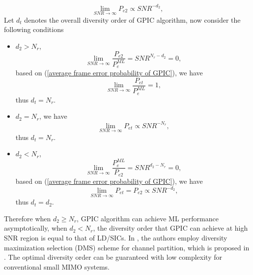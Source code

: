 \documentclass[12pt, draftclsnofoot, onecolumn]{IEEEtran}
\begin{document}
\begin{equation}
\lim_{SNR\to\infty}P_{e2}\propto SNR^{-d_{2}},
\label{LD diversity}
\end{equation}
Let $d_{t}$ denotes the overall diversity order of GPIC algorithm, now consider the following conditions
\begin{itemize}
\item $d_{2}>N_{r}$,
\begin{equation}
\lim_{SNR\to\infty}\frac{P_{e2}}{P^{ML}_{e}}=SNR^{N_{r}-d_{2}}=0,
\label{condition1sub1}
\end{equation}
based on (\ref{average frame error probability of GPIC}), we have
\begin{equation}
\lim_{SNR\to\infty}\frac{P_{et}}{P^{ML}_{e}}=1,
\label{condition1sub2}
\end{equation}
thus $d_{t}=N_{r}$.
\item $d_2=N_{r}$,
we have 
\begin{equation}
\lim_{SNR\to\infty}P_{et}\propto SNR^{-N_{r}},
\label{condition2sub1}
\end{equation}
thus $d_{t}=N_{r}$.
\item $d_{2}<N_{r}$,
\begin{equation}
\lim_{SNR\to\infty}\frac{P^{ML}_{e}}{P_{e2}}=SNR^{d_{2}-N_{r}}=0,
\label{condition3sub1}
\end{equation}
based on (\ref{average frame error probability of GPIC}), we have  
\begin{equation}
\lim_{SNR\to\infty}P_{et}=P_{e2}\propto SNR^{-d_{2}},
\label{condition3sub2}
\end{equation}
thus 
$d_{t}=d_{2}$.
\end{itemize} 
Therefore when $d_{2}\geq N_{r}$, GPIC algorithm can achieve ML performance asymptotically, when $d_{2}<N_{r}$, the diversity order that GPIC can achieve at high SNR region is equal to that of LD/SICs. In \cite{radji2009interference}, the authors employ diversity maximization selection (DMS) scheme for channel partition, which is proposed in \cite{zhang2006diversity}. The optimal diversity order can be guaranteed with low complexity for conventional small MIMO systems.
\end{document}
